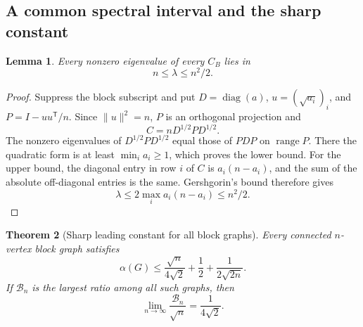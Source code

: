\documentclass[11pt,a4paper]{article}
\newtheorem{theorem}{Theorem}[section]
\newtheorem{lemma}[theorem]{Lemma}
\theoremstyle{definition}
\theoremstyle{remark}
\numberwithin{equation}{section}
\begin{document}
\subsection{A common spectral interval and the sharp constant}

\begin{lemma}\label{p4:lem:block-eigenvalue-interval}
Every nonzero eigenvalue of every $C_B$ lies in
\[
 n\leq\lambda\leq n^2/2.
\]
\end{lemma}

\begin{proof}
Suppress the block subscript and put
$D=\operatorname{diag}(a)$, $u=(\sqrt{a_i})_i$, and
$P=I-uu^{\mathsf T}/n$.
Since $\|u\|^2=n$, $P$ is an orthogonal projection and
\[
 C=nD^{1/2}PD^{1/2}.
\]
The nonzero eigenvalues of $D^{1/2}PD^{1/2}$ equal those of $PDP$
on $\operatorname{range}P$.
There the quadratic form is at least $\min_i a_i\geq1$,
which proves the lower bound.
For the upper bound, the diagonal entry in row $i$ of $C$ is
$a_i(n-a_i)$, and the sum of the absolute off-diagonal entries is
the same.  Gershgorin's bound therefore gives
\[
 \lambda\leq2\max_i a_i(n-a_i)\leq n^2/2.
\]
\end{proof}

\begin{theorem}[Sharp leading constant for all block graphs]
\label{p4:thm:block-sharp-leading}
Every connected $n$-vertex block graph satisfies
\begin{equation}\label{p4:eq:block-finite-bound}
 \alpha(G)\leq
 \frac{\sqrt n}{4\sqrt2}+\frac12+\frac1{2\sqrt{2n}}.
\end{equation}
If $\mathcal B_n$ is the largest ratio among all such graphs, then
\begin{equation}\label{p4:eq:block-limit}
 \lim_{n\to\infty}\frac{\mathcal B_n}{\sqrt n}
 =\frac1{4\sqrt2}.
\end{equation}
\end{theorem}
\end{document}
